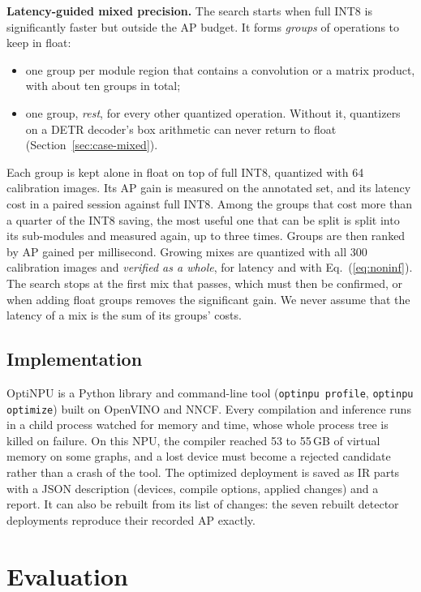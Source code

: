 \documentclass[conference]{IEEEtran}
\newcommand{\tool}{OptiNPU}
\begin{document}
\textbf{Latency-guided mixed precision.} The search starts when full INT8 is significantly faster but outside the AP budget. It forms \emph{groups} of operations to keep in float:
\begin{itemize}
\item one group per module region that contains a convolution or a matrix product, with about ten groups in total;
\item one group, \emph{rest}, for every other quantized operation. Without it, quantizers on a DETR decoder's box arithmetic can never return to float (Section~\ref{sec:case-mixed}).
\end{itemize}
Each group is kept alone in float on top of full INT8, quantized with 64 calibration images. Its AP gain is measured on the annotated set, and its latency cost in a paired session against full INT8. Among the groups that cost more than a quarter of the INT8 saving, the most useful one that can be split is split into its sub-modules and measured again, up to three times. Groups are then ranked by AP gained per millisecond. Growing mixes are quantized with all 300 calibration images and \emph{verified as a whole}, for latency and with Eq.~(\ref{eq:noninf}). The search stops at the first mix that passes, which must then be confirmed, or when adding float groups removes the significant gain. We never assume that the latency of a mix is the sum of its groups' costs.

\subsection{Implementation}

\tool{} is a Python library and command-line tool (\texttt{optinpu profile}, \texttt{optinpu optimize}) built on OpenVINO and NNCF. Every compilation and inference runs in a child process watched for memory and time, whose whole process tree is killed on failure. On this NPU, the compiler reached 53 to 55\,GB of virtual memory on some graphs, and a lost device must become a rejected candidate rather than a crash of the tool. The optimized deployment is saved as IR parts with a JSON description (devices, compile options, applied changes) and a report. It can also be rebuilt from its list of changes: the seven rebuilt detector deployments reproduce their recorded AP exactly.

\section{Evaluation}
\end{document}
